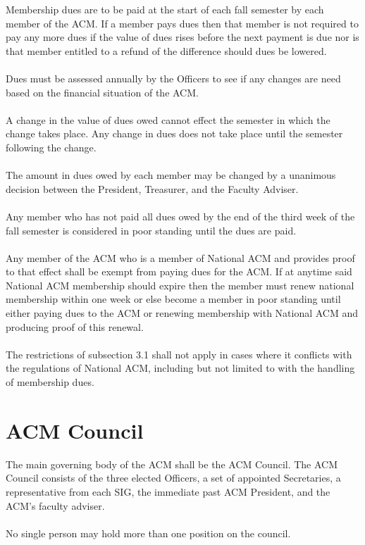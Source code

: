 \documentclass[12pt,titlepage]{article}
\begin{document}
Membership dues are to be paid at the start of each fall semester by each member of the ACM. If a member pays dues then that member is not required to pay any more dues if the value of dues rises before the next payment is due nor is that member entitled to a refund of the difference should dues be lowered.\\
\\
Dues must be assessed annually by the Officers to see if any changes are need based on the financial situation of the ACM.\\
\\
A change in the value of dues owed cannot effect the semester in which the change takes place. Any change in dues does not take place until the semester following the change.\\
\\
The amount in dues owed by each member may be changed by a unanimous decision between the President, Treasurer, and the Faculty Adviser.\\
\\
Any member who has not paid all dues owed by the end of the third week of the fall semester is considered in poor standing until the dues are paid.\\
\\
Any member of the ACM who is a member of National ACM and provides proof to that effect shall be exempt from paying dues for the ACM. If at anytime said National ACM membership should expire then the member must renew national membership within one week or else become a member in poor standing until either paying dues to the ACM or renewing membership with National ACM and producing proof of this renewal.\\
\\
The restrictions of subsection 3.1 shall not apply in cases where it conflicts with the regulations of National ACM, including but not limited to with the handling of membership dues.

\section{ACM Council}

The main governing body of the ACM shall be the ACM Council. The ACM Council consists of the three elected Officers, a set of appointed Secretaries, a representative from each SIG, the immediate past ACM President, and the ACM's faculty adviser.\\
\\
No single person may hold more than one position on the council.
\end{document}
